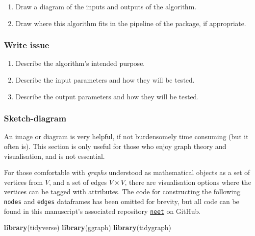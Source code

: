 \documentclass[
]{article}
\newenvironment{Shaded}{\begin{snugshade}}{\end{snugshade}}
\newcommand{\KeywordTok}[1]{\textcolor[rgb]{0.13,0.29,0.53}{\textbf{#1}}}
\newcommand{\NormalTok}[1]{#1}
\providecommand{\tightlist}{%
  \setlength{\itemsep}{0pt}\setlength{\parskip}{0pt}}
\begin{document}
\begin{enumerate}
\def\labelenumi{\arabic{enumi}.}
\tightlist
\item
  Draw a diagram of the inputs and outputs of the algorithm.
\item
  Draw where this algorithm fits in the pipeline of the package, if appropriate.
\end{enumerate}

\hypertarget{write-issue}{%
\subsubsection{Write issue}\label{write-issue}}

\begin{enumerate}
\def\labelenumi{\arabic{enumi}.}
\tightlist
\item
  Describe the algorithm's intended purpose.
\item
  Describe the input parameters and how they will be tested.
\item
  Describe the output parameters and how they will be tested.
\end{enumerate}

\hypertarget{sketch-diagram}{%
\subsubsection{Sketch-diagram}\label{sketch-diagram}}

An image or diagram is very helpful, if not burdensomely time consuming (but it often is). This section is only useful for those who enjoy graph theory and visualisation, and is not essential.

For those comfortable with \emph{graphs} understood as mathematical objects as a set of vertices from \(V\), and a set of edges \(V \times V\), there are visualisation options where the vertices can be tagged with attributes. The code for constructing the following \texttt{nodes} and \texttt{edges} dataframes has been omitted for brevity, but all code can be found in this manuscript's associated repository \href{https://github.com/softloud/neet}{\texttt{neet}} on GitHub.

\begin{Shaded}
\begin{Highlighting}[]
\KeywordTok{library}\NormalTok{(tidyverse)}
\KeywordTok{library}\NormalTok{(ggraph)}
\KeywordTok{library}\NormalTok{(tidygraph)}
\end{Highlighting}
\end{Shaded}
\end{document}
